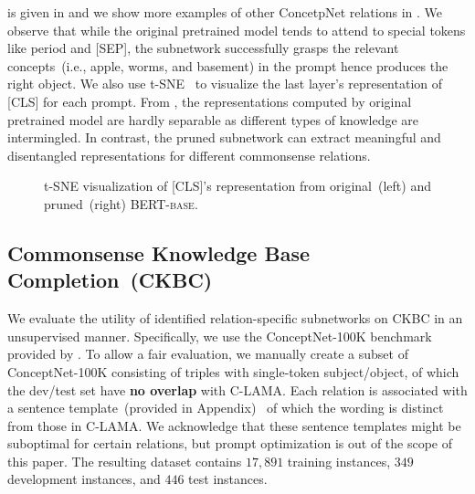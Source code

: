 is given in  and we show more examples of other ConcetpNet 
relations in . We observe that while the original 
pretrained model tends to attend to special tokens like period and [SEP], 
the subnetwork successfully grasps the relevant concepts~(i.e., apple, 
worms, and basement) in the prompt hence produces the right object. 
We also use t-SNE~\citep{vanDerMaaten2008} to visualize the last layer's 
representation of [CLS] for each prompt. From , the 
representations computed by original pretrained model are hardly separable as 
different types of knowledge are intermingled. In contrast, the pruned 
subnetwork can extract meaningful and disentangled representations for 
different commonsense relations.

\begin{figure}[th]
	\centering
	\caption{t-SNE visualization of [CLS]'s representation from original~(left) and pruned~(right) \textsc{BERT-base}.} \label{fig:tsne}
\end{figure}


\subsection{Commonsense Knowledge Base Completion~(CKBC)}
\label{sec:ckbc}
We evaluate the utility of identified relation-specific subnetworks on CKBC in an unsupervised manner. Specifically, we use the ConceptNet-100K benchmark provided by \citet{Li2016}. To allow a fair evaluation, we manually create a subset of ConceptNet-100K 
consisting of triples with single-token subject/object, of which the dev/test set have \textbf{no overlap} with C-LAMA. 
Each relation is associated with a sentence template~(provided in 
Appendix)~\citep{Kwon2019} of which the wording is distinct from 
those in C-LAMA. We acknowledge that these sentence templates might be suboptimal for certain relations, but prompt optimization is 
out of the scope of this paper. The resulting dataset contains 
$17,891$ training instances, $349$ development instances, 
and $446$ test instances.

